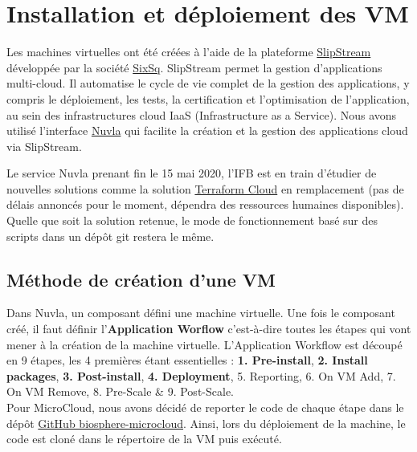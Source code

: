 \section {Installation et déploiement des VM}
Les machines virtuelles ont été créées à l'aide de la plateforme \href{https://github.com/slipstream/SlipStream}{SlipStream} développée par la société \href {https://sixsq.com/}{SixSq}. SlipStream permet la gestion d'applications multi-cloud. Il automatise le cycle de vie complet de la gestion des applications, y compris le déploiement, les tests, la certification et l'optimisation de l'application, au sein des infrastructures cloud IaaS (Infrastructure as a Service). Nous avons utilisé l'interface \href {https://docs.nuvla.io/nuvla}{Nuvla} qui facilite la création et la gestion des applications cloud via SlipStream.
\newline

Le service Nuvla prenant fin le 15 mai 2020, l'IFB est en train d'étudier de nouvelles solutions comme la solution \href {https://www.hashicorp.com/blog/announcing-terraform-cloud/}{Terraform Cloud} en remplacement (pas de délais annoncés pour le moment, dépendra des ressources humaines disponibles). Quelle que soit la solution retenue, le mode de fonctionnement basé sur des scripts dans un dépôt git restera le même.

\subsection{Méthode de création d'une VM}

Dans Nuvla, un composant défini une machine virtuelle. Une fois le composant créé, il faut définir l'\textbf{Application Worflow} c'est-à-dire toutes les étapes qui vont mener à la création de la machine virtuelle.
L'Application Workflow est découpé en 9 étapes, les 4 premières étant essentielles : \textbf{1. Pre-install}, \textbf{2. Install packages}, \textbf{3. Post-install}, \textbf{4. Deployment}, 5. Reporting, 6. On VM Add, 7. On VM Remove, 8. Pre-Scale \& 9. Post-Scale.\\

Pour MicroCloud, nous avons décidé de reporter le code de chaque étape dans le dépôt \href{https://github.com/IFB-ElixirFr/biosphere-microcloud}{GitHub biosphere-microcloud}. Ainsi, lors du déploiement de la machine, le code est cloné dans le répertoire  de la VM puis exécuté.
\newline

